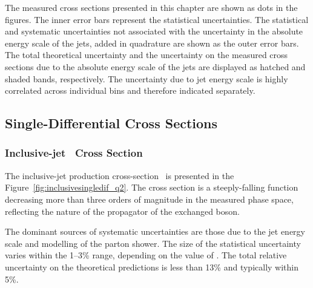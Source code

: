 The measured cross sections presented in this chapter are shown as dots in the figures. The inner error bars represent the statistical uncertainties. The statistical and systematic uncertainties not associated with the uncertainty in the absolute energy scale of the jets, added in quadrature are shown as the outer error bars. The total theoretical uncertainty and the uncertainty on the measured cross sections due to the absolute energy scale of the jets are displayed as hatched and shaded bands, respectively. The uncertainty due to jet energy scale is highly correlated across individual bins and therefore indicated separately.

\subsection{Single-Differential Cross Sections}
\subsubsection*{Inclusive-jet \dsdqsq~Cross Section}
The inclusive-jet production cross-section \dsdqsq~is presented in the Figure~\ref{fig:inclusivesingledif_q2}. The cross section is a steeply-falling function decreasing more than three orders of magnitude in the measured phase space, reflecting the nature of the propagator of the exchanged boson.

The dominant sources of systematic uncertainties are those due to the jet energy scale and modelling of the parton shower. The size of the statistical uncertainty varies within the 1--3\% range, depending on the value of \qsq. %
The total relative uncertainty on the theoretical predictions is less than 13\% and typically within 5\%. %

